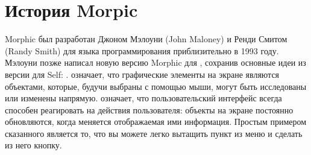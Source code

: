 \documentclass[a4paper,10pt,twoside]{book}
\begin{document}
\section{История Morpic}

Morphic был разработан Джоном Мэлоуни (John Maloney) и Ренди Смитом (Randy Smith) для языка программирования  приблизительно в 1993 году.
Мэлоуни позже написал новую версию Morphic для \squeak, сохранив основные идеи из версии для Self: .
 означает, что графические элементы на экране являются объектами, которые, будучи выбраны с помощью мыши, могут быть исследованы или изменены напрямую.
 означает, что пользовательский интерфейс всегда способен реагировать на действия пользователя: объекты на экране постоянно обновляются, когда меняется отображаемая ими информация.
Простым примером сказанного является то, что вы можете легко вытащить пункт из меню и сделать из него кнопку.

\end{document}
